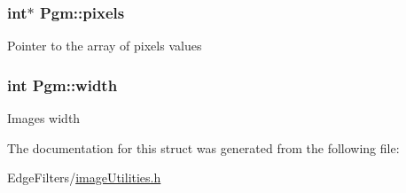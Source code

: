 \subsubsection[{pixels}]{\setlength{\rightskip}{0pt plus 5cm}int$\ast$ Pgm\+::pixels}\label{struct_pgm_ae17366c9c7b4703933dffc77ba68b77c}
Pointer to the array of pixels values \hypertarget{struct_pgm_a093d928bb493b2da54111430b9892431}{}
\subsubsection[{width}]{\setlength{\rightskip}{0pt plus 5cm}int Pgm\+::width}\label{struct_pgm_a093d928bb493b2da54111430b9892431}
Image\textquotesingle{}s width 

The documentation for this struct was generated from the following file\+:\begin{DoxyCompactItemize}
\item 
Edge\+Filters/\hyperlink{image_utilities_8h}{image\+Utilities.\+h}\end{DoxyCompactItemize}
